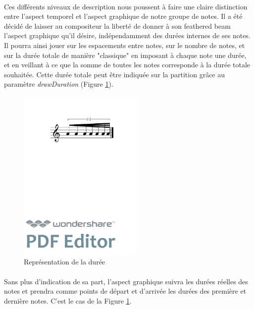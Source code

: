 \documentclass[a4paper,10pt,twocolumn]{article}
\newenvironment{code}
  {\fontfamily{pnc}\selectfont}{}
\begin{document}
\paragraph{}
Ces différents niveaux de description nous poussent à faire une claire distinction entre l'aspect temporel et l'aspect graphique de notre groupe de notes.  Il a été décidé de laisser au compositeur la liberté de donner à son feathered beam l'aspect graphique qu'il désire, indépendamment des durées internes de ses notes. Il pourra ainsi jouer sur les espacements entre notes, sur le nombre de notes, et sur la durée totale de manière "classique" en imposant à chaque note une durée, et en veillant à ce que la somme de toutes les notes corresponde à la durée totale souhaitée. Cette durée totale peut être indiquée sur la partition grâce au paramètre \textit{drawDuration} (Figure \ref{fig:fbeamduree}).

\begin{figure}[h]
\centering
\begin{code}
[ \textbackslash{}fBeam\textless{}drawDuration="true"\textgreater{}

( a/8 a a/16 a a a/32 a ) ]
\end{code}
\includegraphics[width=6cm]{img/fbeamduree.pdf}
\caption{Représentation de la durée}
\label{fig:fbeamduree}
\end{figure}

\paragraph{}
Sans plus d'indication de sa part, l'aspect graphique suivra les durées réelles des notes et prendra comme points de départ et d'arrivée les durées des première et dernière notes.  C'est le cas de la Figure \ref{fig:fbeamduree}.
\end{document}
